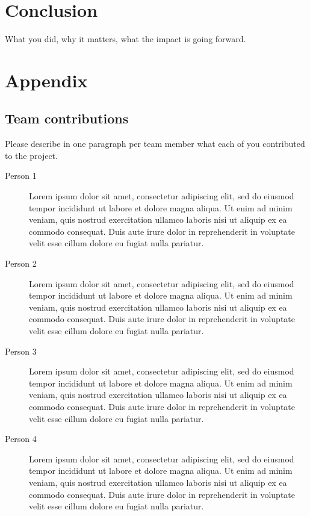 \documentclass[10pt,twocolumn,letterpaper]{article}
\begin{document}
\begin{enumerate}
\end{enumerate}

\section{Conclusion}

What you did, why it matters, what the impact is going forward.

{\small


}

\section*{Appendix}

\subsection*{Team contributions}

Please describe in one paragraph per team member what each of you contributed to the project.
\begin{description}
\item[Person 1] Lorem ipsum dolor sit amet, consectetur adipiscing elit, sed do eiusmod tempor incididunt ut labore et dolore magna aliqua. Ut enim ad minim veniam, quis nostrud exercitation ullamco laboris nisi ut aliquip ex ea commodo consequat. Duis aute irure dolor in reprehenderit in voluptate velit esse cillum dolore eu fugiat nulla pariatur. 
\item[Person 2] Lorem ipsum dolor sit amet, consectetur adipiscing elit, sed do eiusmod tempor incididunt ut labore et dolore magna aliqua. Ut enim ad minim veniam, quis nostrud exercitation ullamco laboris nisi ut aliquip ex ea commodo consequat. Duis aute irure dolor in reprehenderit in voluptate velit esse cillum dolore eu fugiat nulla pariatur.
\item [Person 3] Lorem ipsum dolor sit amet, consectetur adipiscing elit, sed do eiusmod tempor incididunt ut labore et dolore magna aliqua. Ut enim ad minim veniam, quis nostrud exercitation ullamco laboris nisi ut aliquip ex ea commodo consequat. Duis aute irure dolor in reprehenderit in voluptate velit esse cillum dolore eu fugiat nulla pariatur. 
\item [Person 4] Lorem ipsum dolor sit amet, consectetur adipiscing elit, sed do eiusmod tempor incididunt ut labore et dolore magna aliqua. Ut enim ad minim veniam, quis nostrud exercitation ullamco laboris nisi ut aliquip ex ea commodo consequat. Duis aute irure dolor in reprehenderit in voluptate velit esse cillum dolore eu fugiat nulla pariatur.
\end{description}
\end{document}
